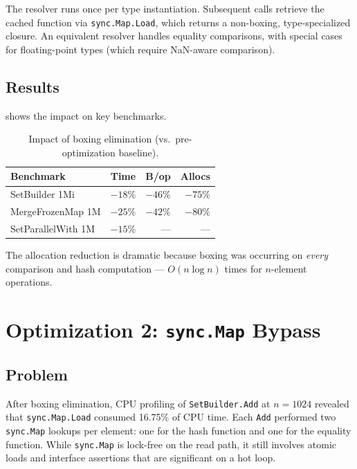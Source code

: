 \documentclass[11pt,twocolumn]{article}
\begin{document}
The resolver runs once per type instantiation.
Subsequent calls retrieve the cached function via \texttt{sync.Map.Load},
which returns a non-boxing, type-specialized closure.
An equivalent resolver handles equality comparisons, with special cases for
floating-point types (which require NaN-aware comparison).

\subsection{Results}

 shows the impact on key benchmarks.

\begin{table}[h]
\centering
\caption{Impact of boxing elimination (vs.\ pre-optimization baseline).}
\label{tab:boxing}
\begin{tabular}{@{}lrrr@{}}
\toprule
Benchmark & Time & B/op & Allocs \\
\midrule
SetBuilder 1Mi  & $-18\%$ & $-46\%$ & $-75\%$ \\
MergeFrozenMap 1M & $-25\%$ & $-42\%$ & $-80\%$ \\
SetParallelWith 1M & $-15\%$ & --- & --- \\
\bottomrule
\end{tabular}
\end{table}

The allocation reduction is dramatic because boxing was occurring on
\emph{every} comparison and hash computation --- $O(n \log n)$ times for
$n$-element operations.

\section{Optimization 2: \texttt{sync.Map} Bypass}
\label{sec:syncmap}

\subsection{Problem}

After boxing elimination, CPU profiling of \texttt{SetBuilder.Add} at
$n = 1024$ revealed that \texttt{sync.Map.Load} consumed 16.75\% of CPU
time.
Each \texttt{Add} performed two \texttt{sync.Map} lookups per element: one
for the hash function and one for the equality function.
While \texttt{sync.Map} is lock-free on the read path, it still involves
atomic loads and interface assertions that are significant on a hot loop.
\end{document}
